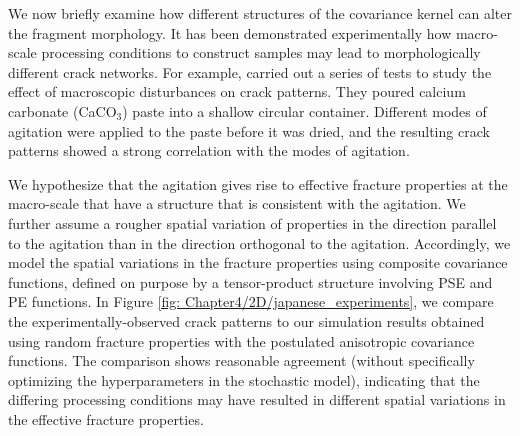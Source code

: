 We now briefly examine how different structures of the covariance kernel can alter the fragment morphology. It has been demonstrated experimentally \cite{kitsunezaki2016shaking, kitsunezaki2017stress, halasz2017effect, kitsunezaki2017memory, nakahara2018mechanism}
how macro-scale processing conditions to construct samples may lead to morphologically different crack networks.  For example, \citet{kitsunezaki2017memory} carried out a series of tests to study the effect of macroscopic disturbances on crack patterns. They poured calcium carbonate (CaCO$_3$) paste into a shallow circular container. Different modes of agitation were applied to the paste before it was dried, and the resulting crack patterns showed a strong correlation with the modes of agitation.

We hypothesize that the agitation gives rise to effective fracture properties at the macro-scale that have a structure that is consistent with the agitation. We further assume a rougher spatial variation of properties in the direction parallel to the agitation than in the direction orthogonal to the agitation. Accordingly, we model the spatial variations in the fracture properties using composite covariance functions, defined on purpose by a tensor-product structure involving PSE and PE functions. In Figure \ref{fig: Chapter4/2D/japanese_experiments}, we compare the experimentally-observed crack patterns to our simulation results obtained using random fracture properties with the postulated anisotropic covariance functions. The comparison shows reasonable agreement (without specifically optimizing the  hyperparameters in the stochastic model), indicating that the differing processing conditions may have resulted in different spatial variations in the effective fracture properties.



